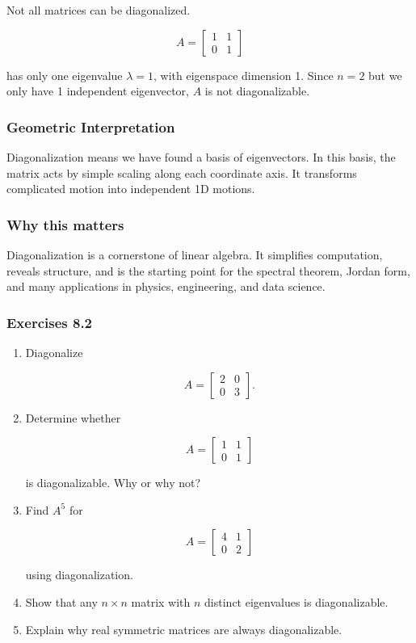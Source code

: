\documentclass[
  12pt,
  a4paper,
]{article}
\begin{document}
Not all matrices can be diagonalized.

\[A = \begin{bmatrix} 1 & 1 \\ 0 & 1 \end{bmatrix}\]

has only one eigenvalue \(\lambda = 1\), with eigenspace dimension 1.
Since \(n=2\) but we only have 1 independent eigenvector, \(A\) is not
diagonalizable.

\subsubsection{Geometric
Interpretation}\label{geometric-interpretation-17}

Diagonalization means we have found a basis of eigenvectors. In this
basis, the matrix acts by simple scaling along each coordinate axis. It
transforms complicated motion into independent 1D motions.

\subsubsection{Why this matters}\label{why-this-matters-29}

Diagonalization is a cornerstone of linear algebra. It simplifies
computation, reveals structure, and is the starting point for the
spectral theorem, Jordan form, and many applications in physics,
engineering, and data science.

\subsubsection{Exercises 8.2}\label{exercises-82}

\begin{enumerate}
\def\labelenumi{\arabic{enumi}.}
\item
  Diagonalize

  \[A = \begin{bmatrix} 2 & 0 \\ 0 & 3 \end{bmatrix}.\]
\item
  Determine whether

  \[A = \begin{bmatrix} 1 & 1 \\ 0 & 1 \end{bmatrix}\]

  is diagonalizable. Why or why not?
\item
  Find \(A^5\) for

  \[A = \begin{bmatrix} 4 & 1 \\ 0 & 2 \end{bmatrix}\]

  using diagonalization.
\item
  Show that any \(n \times n\) matrix with \(n\) distinct eigenvalues is
  diagonalizable.
\item
  Explain why real symmetric matrices are always diagonalizable.
\end{enumerate}
\end{document}
